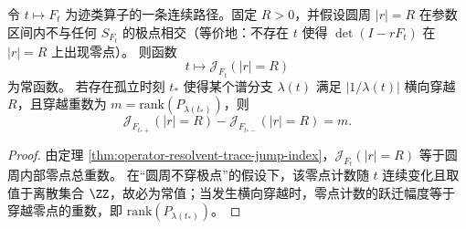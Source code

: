 \begin{corollary}\label{cor:operator-resolvent-trace-spectral-flow-quantization}
令 \(t\mapsto F_t\) 为迹类算子的一条连续路径。固定 \(R>0\)，并假设圆周 \(|r|=R\) 在参数区间内不与任何 \(S_{F_t}\) 的极点相交（等价地：不存在 \(t\) 使得 \(\det(I-rF_t)\) 在 \(|r|=R\) 上出现零点）。
则函数
\[
t\longmapsto \mathcal J_{F_t}(|r|=R)
\]
为常函数。
若存在孤立时刻 \(t_\ast\) 使得某个谱分支 \(\lambda(t)\) 满足 \(|1/\lambda(t)|\) 横向穿越 \(R\)，且穿越重数为 \(m=\mathrm{rank}(P_{\lambda(t_\ast)})\)，则
\[
\mathcal J_{F_{t_\ast+}}(|r|=R)-\mathcal J_{F_{t_\ast-}}(|r|=R)=m.
\]
\end{corollary}
\begin{proof}
由定理 \ref{thm:operator-resolvent-trace-jump-index}，\(\mathcal J_{F_t}(|r|=R)\) 等于圆周内部零点总重数。
在“圆周不穿极点”的假设下，该零点计数随 \(t\) 连续变化且取值于离散集合 \(\ZZ\)，故必为常值；当发生横向穿越时，零点计数的跃迁幅度等于穿越零点的重数，即 \(\mathrm{rank}(P_{\lambda(t_\ast)})\)。
\end{proof}

\endinput
